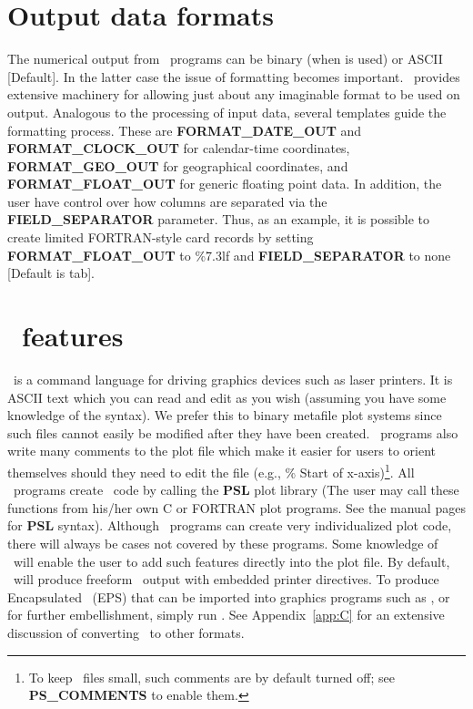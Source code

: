 \section{Output data formats}
\label{sec:output data}

The numerical output from \GMT\ programs can be binary (when  is used) or ASCII [Default].
In the latter case the issue of formatting becomes important.  \GMT\ provides extensive
machinery for allowing just about any imaginable format to be used on output.  Analogous to
the processing of input data, several templates guide the formatting process.  These are
\textbf{FORMAT\_DATE\_OUT} and \textbf{FORMAT\_CLOCK\_OUT} for calendar-time coordinates,
\textbf{FORMAT\_GEO\_OUT} for geographical coordinates, and \textbf{FORMAT\_FLOAT\_OUT} for generic
floating point data.  In addition, the user have control over how columns are separated via
the \textbf{FIELD\_SEPARATOR} parameter.  Thus, as an example, it is possible to create limited
FORTRAN-style card records by setting \textbf{FORMAT\_FLOAT\_OUT} to \%7.3lf and \textbf{FIELD\_SEPARATOR} to
none [Default is tab].

\section{\PS\ features}
\PS\ is a command language for driving graphics
devices such as laser printers.  It is ASCII text which you
can read and edit as you wish (assuming you have some knowledge
of the syntax).  We prefer this to binary metafile plot
systems since such files cannot easily be modified after they
have been created.  \GMT\ programs also write many comments to
the plot file which make it easier for users to orient
themselves should they need to edit the file (e.g., \% Start
of x-axis)\footnote{To keep \PS\ files small, such comments are by default
turned off; see \textbf{PS\_COMMENTS} to enable them.}.  All \GMT\ programs create \PS\ code by
calling the \textbf{PSL} plot library (The user may call these
functions from his/her own C or FORTRAN plot programs. See the
manual pages for \textbf{PSL} syntax).  Although \GMT\ programs
can create very individualized plot code, there will always be
cases not covered by these programs.  Some knowledge of
\PS\ will enable the user to add such features
directly into the plot file.  By default, \GMT\ will produce
freeform \PS\ output with embedded printer directives.  To
produce Encapsulated \PS\ (EPS) that can be imported into graphics programs such as
,  or  for further
embellishment, simply run  .  See Appendix~\ref{app:C}
for an extensive discussion of converting \PS\ to other formats.

